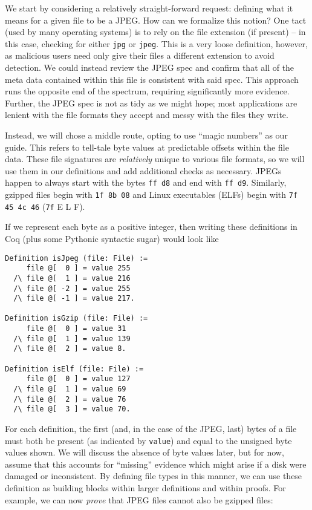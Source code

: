 \documentclass[nocopyrightspace]{sigplanconf}
\begin{document}
We start by considering a relatively straight-forward request: defining what
it means for a given file to be a JPEG. How can we formalize this notion? One
tact (used by many operating systems) is to rely on the file extension (if
present) -- in this case, checking for either {\tt jpg} or {\tt jpeg}. This is
a very loose definition, however, as malicious users need only give their
files a different extension to avoid detection. We could instead review the
JPEG spec and confirm that all of the meta data contained within this file is
consistent with said spec. This approach runs the opposite end of the
spectrum, requiring significantly more evidence. Further, the JPEG spec is not
as tidy as we might hope; most applications are lenient with the file formats
they accept and messy with the files they write.

Instead, we will chose a middle route, opting to use ``magic numbers'' as our
guide. This refers to tell-tale byte values at predictable offsets within the
file data. These file signatures are {\it relatively} unique to various file
formats, so we will use them in our definitions and add additional checks as
necessary. JPEGs happen to always start with the bytes {\tt ff d8} and end
with {\tt ff d9}. Similarly, gzipped files begin with {\tt 1f 8b 08} and Linux
executables (ELFs) begin with {\tt 7f 45 4c 46} ({\tt 7f} E L F).

If we represent each byte as a positive integer, then writing these
definitions in Coq (plus some Pythonic syntactic sugar) would look like

\begin{lstlisting}
Definition isJpeg (file: File) :=
     file @[  0 ] = value 255
  /\ file @[  1 ] = value 216 
  /\ file @[ -2 ] = value 255
  /\ file @[ -1 ] = value 217.

Definition isGzip (file: File) :=
     file @[  0 ] = value 31
  /\ file @[  1 ] = value 139 
  /\ file @[  2 ] = value 8.

Definition isElf (file: File) :=
     file @[  0 ] = value 127
  /\ file @[  1 ] = value 69 
  /\ file @[  2 ] = value 76
  /\ file @[  3 ] = value 70.
\end{lstlisting}

For each definition, the first (and, in the case of the JPEG, last) bytes of a
file must both be present (as indicated by {\tt value}) and equal to the
unsigned byte values shown. We will discuss the absence of byte values later,
but for now, assume that this accounts for ``missing'' evidence which might
arise if a disk were damaged or inconsistent. By defining file types in this
manner, we can use these definition as building blocks within larger
definitions and within proofs. For example, we can now {\it prove} that JPEG
files cannot also be gzipped files:
\end{document}
